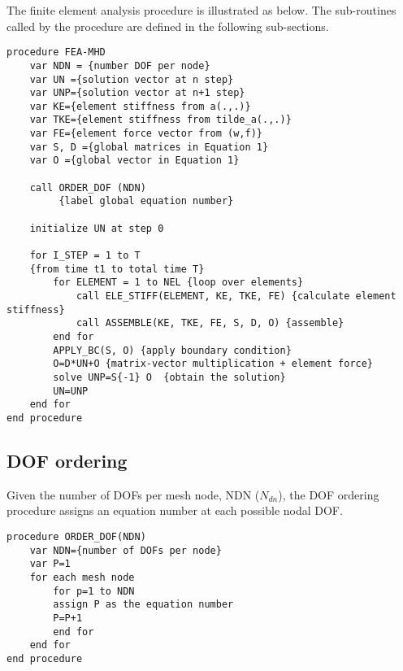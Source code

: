 \documentclass[11pt]{article}  %
\begin{document}
The finite element analysis procedure is illustrated as below. The sub-routines called by the procedure are defined in the following sub-sections.
\begin{samepage}
\begin{verbatim}
procedure FEA-MHD
    var NDN = {number DOF per node}
    var UN ={solution vector at n step}
    var UNP={solution vector at n+1 step}
    var KE={element stiffness from a(.,.)}
    var TKE={element stiffness from tilde_a(.,.)}
    var FE={element force vector from (w,f)}
    var S, D ={global matrices in Equation 1}
    var O ={global vector in Equation 1}
    
    call ORDER_DOF (NDN) 
         {label global equation number}
    
    initialize UN at step 0
    
    for I_STEP = 1 to T
    {from time t1 to total time T}
        for ELEMENT = 1 to NEL {loop over elements}
            call ELE_STIFF(ELEMENT, KE, TKE, FE) {calculate element stiffness}
            call ASSEMBLE(KE, TKE, FE, S, D, O) {assemble}
        end for
        APPLY_BC(S, O) {apply boundary condition} 
        O=D*UN+O {matrix-vector multiplication + element force}
        solve UNP=S{-1} O  {obtain the solution}
        UN=UNP
    end for
end procedure
\end{verbatim}
\end{samepage}
 \subsection{DOF ordering}

Given the number of DOFs per mesh node, NDN ($N_{dn}$), the DOF ordering procedure assigns an equation number at each possible nodal DOF.
\begin{samepage}
\begin{verbatim}
procedure ORDER_DOF(NDN)
    var NDN={number of DOFs per node}
    var P=1
    for each mesh node
        for p=1 to NDN
        assign P as the equation number
        P=P+1 
        end for
    end for
end procedure
\end{verbatim}
\end{samepage}
\end{document}
